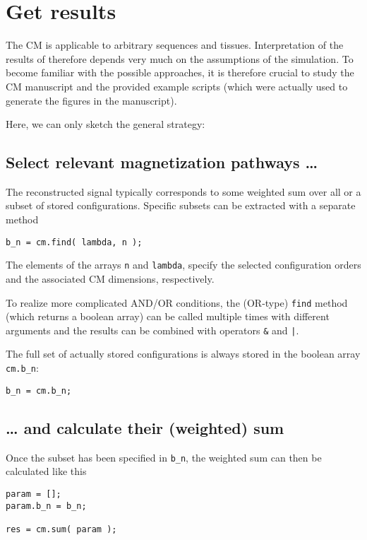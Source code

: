 \documentclass[a4paper,10pt]{article}
\begin{document}
\section{Get results}
\label{sec:orgdbccbdc}
The CM is applicable to arbitrary sequences and tissues. Interpretation of the results of therefore  
depends very much on the assumptions of the simulation. To become familiar with the possible
approaches, it is therefore crucial to study the CM manuscript and the provided example scripts (which were actually used 
to generate the figures in the manuscript).

Here, we can only sketch the general strategy:

\subsection{Select relevant magnetization pathways \dots{}}
\label{sec:orgdb0c650}

The reconstructed signal typically corresponds to some weighted sum over all or
a subset of stored configurations.
Specific subsets can be extracted with a separate method

\begin{verbatim}
b_n = cm.find( lambda, n );
\end{verbatim}

The elements of the arrays \texttt{n} and \texttt{lambda}, specify the selected configuration orders and the associated CM dimensions, 
respectively.

To realize more complicated AND/OR conditions, the (OR-type) \texttt{find} method (which returns a boolean array)
can be called multiple times with different arguments and the results can be combined with operators \texttt{\&} and \texttt{|}. 

The full set of actually stored configurations is always stored in the boolean array \texttt{cm.b\_n}:

\begin{verbatim}
b_n = cm.b_n;
\end{verbatim}

\subsection{\dots{} and calculate their (weighted) sum}
\label{sec:org3b3bc34}

Once the subset has been specified in \texttt{b\_n}, the weighted sum can then be calculated like this

\begin{verbatim}
param = [];
param.b_n = b_n;

res = cm.sum( param );
\end{verbatim}
\end{document}
